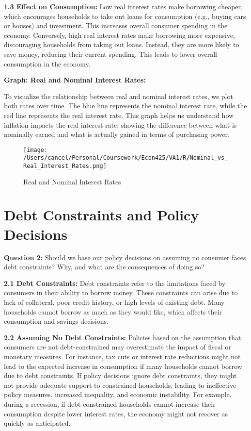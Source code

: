 \documentclass{article}
\begin{document}
\textbf{1.3 Effect on Consumption:} Low real interest rates make borrowing cheaper, which encourages households to take out loans for consumption (e.g., buying cars or houses) and investment. This increases overall consumer spending in the economy. Conversely, high real interest rates make borrowing more expensive, discouraging households from taking out loans. Instead, they are more likely to save money, reducing their current spending. This leads to lower overall consumption in the economy.

\textbf{Graph: Real and Nominal Interest Rates:} 

To visualize the relationship between real and nominal interest rates, we plot both rates over time. The blue line represents the nominal interest rate, while the red line represents the real interest rate. This graph helps us understand how inflation impacts the real interest rate, showing the difference between what is nominally earned and what is actually gained in terms of purchasing power.

\begin{figure}[h!]
    \centering
    \texttt{[image: /Users/cancel/Personal/Coursework/Econ425/VA1/R/Nominal\_vs\_Real\_Interest\_Rates.png]}
    \caption{Real and Nominal Interest Rates}
\end{figure}

\hrulefill

\section{Debt Constraints and Policy Decisions}

\textbf{Question 2:} Should we base our policy decisions on assuming no consumer faces debt constraints? Why, and what are the consequences of doing so?

\textbf{2.1 Debt Constraints:} Debt constraints refer to the limitations faced by consumers in their ability to borrow money. These constraints can arise due to lack of collateral, poor credit history, or high levels of existing debt. Many households cannot borrow as much as they would like, which affects their consumption and savings decisions.

\textbf{2.2 Assuming No Debt Constraints:} Policies based on the assumption that consumers are not debt-constrained may overestimate the impact of fiscal or monetary measures. For instance, tax cuts or interest rate reductions might not lead to the expected increase in consumption if many households cannot borrow due to debt constraints. If policy decisions ignore debt constraints, they might not provide adequate support to constrained households, leading to ineffective policy measures, increased inequality, and economic instability. For example, during a recession, if debt-constrained households cannot increase their consumption despite lower interest rates, the economy might not recover as quickly as anticipated.
\end{document}
